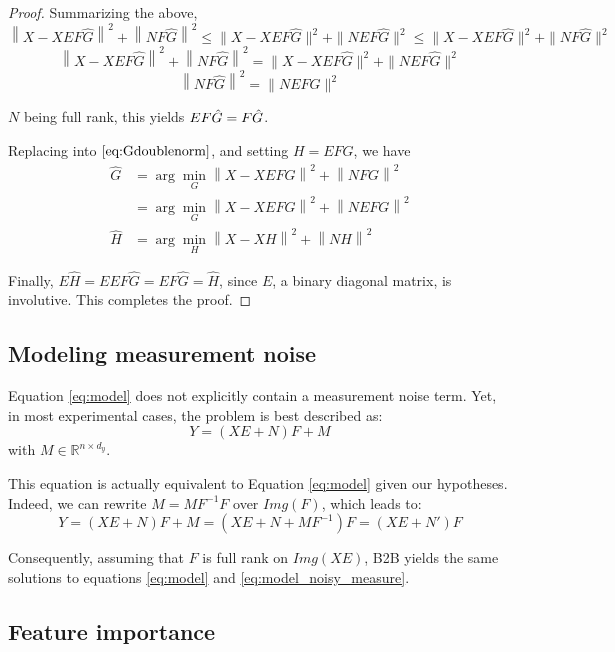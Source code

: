 \begin{proof}
Summarizing the above,
$$\left \| X - XEF\hat G\right\| ^2  + \left \| NF\hat G\right \| ^2 \leq \| X - XEF\hat G \| ^2  + \| NEF\hat G \| ^2 \leq \| X - XEF\hat G \| ^2  + \| NF\hat G \| ^2$$
$$\left \| X - XEF\hat G\right\| ^2  + \left \| NF\hat G\right \| ^2 = \| X - XEF\hat G \| ^2  + \| NEF\hat G \| ^2$$
$$\left \| NF\hat G\right \| ^2 =  \| NEF\hat G \| ^2$$

$N$ being full rank, this yields $EF\hat G = F\Hat G$.

Replacing into $\eqref{eq:Gdoublenorm}$, and setting $H = EFG$, we have
\begin{align*}
	\hat G &=  \arg \min_G  \left \| X - XEFG\right \| ^2  + \left \| NFG\right \| ^2 \\
	&=   \arg \min_G \left \| X - XEFG\right \| ^2  + \left \| NEFG\right \| ^2 \\
	\hat H &=  \arg \min_H \left \| X - XH\right \| ^2  + \left \| NH\right \| ^2
	\label{eq:4}
\end{align*}

Finally, $E\hat H = E EF\hat G = EF\hat G = \hat H$, since $E$, a binary
diagonal matrix, is involutive. This completes the proof.
\end{proof}



\newpage
\subsection{Modeling measurement noise}

Equation \ref{eq:model} does not explicitly contain a measurement noise term.
Yet, in most experimental cases, the problem is best described as:
\begin{equation}
  Y = (XE+N)F+M
  \label{eq:model_noisy_measure}
\end{equation}
  with $M\in \mathbb{R}^{n \times d_y}$.

This equation is actually equivalent to Equation \ref{eq:model} given our
hypotheses. Indeed, we can rewrite $M = MF^{-1}F$ over $Img(F)$, which leads to:
$$Y = (XE+N)F+M = (XE+N+MF^{-1})F = (XE+N')F$$

Consequently, assuming that $F$ is full rank on $Img(XE)$, B2B yields the same
solutions to equations \ref{eq:model} and \ref{eq:model_noisy_measure}.


\subsection{Feature importance}
\label{appendix:feature_importance}


